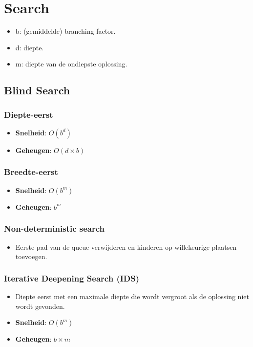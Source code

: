 \documentclass{report}
\begin{document}
  \chapter{Search}
    \begin{itemize}
      \item b: (gemiddelde) branching factor.
      \item d: diepte.
      \item m: diepte van de ondiepste oplossing.
    \end{itemize}
    \section{Blind Search}
      \subsection{Diepte-eerst}
        \begin{itemize}
          \item \textbf{Snelheid}: $O(b^d)$
          \item \textbf{Geheugen}: $O(d \times b)$
        \end{itemize}
      \subsection{Breedte-eerst}
        \begin{itemize}
          \item \textbf{Snelheid}: $O(b^m)$
          \item \textbf{Geheugen}: $b^m$
        \end{itemize}
      \subsection{Non-deterministic search}
        \begin{itemize}
          \item Eerste pad van de queue verwijderen en kinderen op willekeurige plaatsen toevoegen.
        \end{itemize}
      \subsection{Iterative Deepening Search (IDS)}
        \begin{itemize}
          \item Diepte eerst met een maximale diepte die wordt vergroot als de oplossing niet wordt gevonden.
          \item \textbf{Snelheid}: $O(b^m)$
          \item \textbf{Geheugen}: $b \times m$
        \end{itemize}
\end{document}
